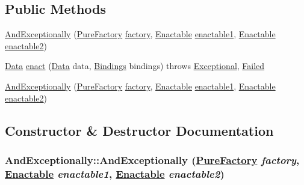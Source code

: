 \subsection*{Public Methods}
\begin{CompactItemize}
\item 
\hyperlink{classAndExceptionally_a0}{And\-Exceptionally} (\hyperlink{classPureFactory}{Pure\-Factory} \hyperlink{classDataImpl_o0}{factory}, \hyperlink{interfaceEnactable}{Enactable} \hyperlink{classAbstractInfixCombinator_o0}{enactable1}, \hyperlink{interfaceEnactable}{Enactable} \hyperlink{classAbstractInfixCombinator_o1}{enactable2})
\item 
\hyperlink{interfaceData}{Data} \hyperlink{classAndExceptionally_a1}{enact} (\hyperlink{interfaceData}{Data} data, \hyperlink{interfaceBindings}{Bindings} bindings) throws \hyperlink{classExceptional}{Exceptional}, \hyperlink{classFailed}{Failed}
\item 
\hyperlink{classAndExceptionally_a2}{And\-Exceptionally} (\hyperlink{classPureFactory}{Pure\-Factory} \hyperlink{classDataImpl_o0}{factory}, \hyperlink{interfaceEnactable}{Enactable} \hyperlink{classAbstractInfixCombinator_o0}{enactable1}, \hyperlink{interfaceEnactable}{Enactable} \hyperlink{classAbstractInfixCombinator_o1}{enactable2})
\end{CompactItemize}


\subsection{Constructor \& Destructor Documentation}
\hypertarget{classAndExceptionally_a0}{
\subsubsection[AndExceptionally]{\setlength{\rightskip}{0pt plus 5cm}And\-Exceptionally::And\-Exceptionally (\hyperlink{classPureFactory}{Pure\-Factory} {\em factory}, \hyperlink{interfaceEnactable}{Enactable} {\em enactable1}, \hyperlink{interfaceEnactable}{Enactable} {\em enactable2})}}
\label{classAndExceptionally_a0}




